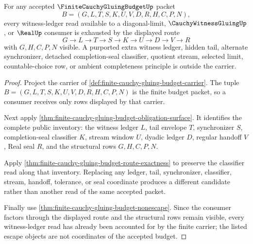 \begin{theorem}
\label{thm:finite-cauchy-gluing-budget-witness-ledger-exhaustion}
For any accepted $\FiniteCauchyGluingBudgetUp$ packet
$$
B=(G,L,T,S,K,U,V,D,R,H,C,P,N),
$$
every witness-ledger read available to a diagonal-limit, $\CauchyWitnessGluingUp$, or $\RealUp$ consumer is exhausted by the displayed route
$$
G \to L \to T \to S \to K \to U \to D \to V \to R
$$
with $G,H,C,P,N$ visible. A purported extra witness ledger, hidden tail, alternate synchronizer, detached completion-seal classifier, quotient stream, selected limit, countable-choice row, or ambient completeness principle is outside the carrier.
\end{theorem}
\begin{proof}
Project the carrier of \autoref{def:finite-cauchy-gluing-budget-carrier}. The tuple $B=(G,L,T,S,K,U,V,D,R,H,C,P,N)$ is the finite budget packet, so a consumer receives only rows displayed by that carrier.

Next apply \autoref{thm:finite-cauchy-gluing-budget-obligation-surface}. It identifies the complete public inventory: the witness ledger $L$, tail envelope $T$, synchronizer $S$, completion-seal classifier $K$, stream window $U$, dyadic ledger $D$, regular handoff $V$, Real seal $R$, and the structural rows $G,H,C,P,N$.

Apply \autoref{thm:finite-cauchy-gluing-budget-route-exactness} to preserve the classifier read along that inventory. Replacing any ledger, tail, synchronizer, classifier, stream, handoff, tolerance, or seal coordinate produces a different candidate rather than another read of the same accepted packet.

Finally use \autoref{thm:finite-cauchy-gluing-budget-nonescape}. Since the consumer factors through the displayed route and the structural rows remain visible, every witness-ledger read has already been accounted for by the finite carrier; the listed escape objects are not coordinates of the accepted budget.
\end{proof}


